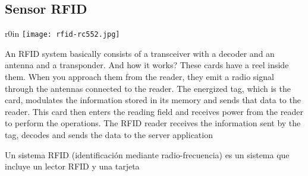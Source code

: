 \documentclass[../informe_krapp.tex]{subfiles}
\begin{document}










%
%
%
\subsection{Sensor RFID}
\begin{wrapfigure}{r}{0in}
	\centering
	\texttt{[image: rfid-rc552.jpg]}
\end{wrapfigure}
An RFID system basically consists of a transceiver with a decoder and an antenna and a transponder. And how it works? These cards have a reel inside them. When you approach them from the reader, they emit a radio signal through the antennas connected to the reader. The energized tag, which is the card, modulates the information stored in its memory and sends that data to the reader. This card then enters the reading field and receives power from the reader to perform the operations. The RFID reader receives the information sent by the tag, decodes and sends the data to the server application

Un sistema RFID (identificación mediante radio-frecuencia) es un sistema que incluye un lector RFID y una tarjeta
\end{document}
